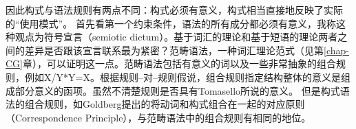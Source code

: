 \noindent 
因此构式与语法规则有两点不同：构式必须有意义，构式相当直接地反映了实际的“使用模式”。
首先看第一个约束条件，语法的所有成分都必须有意义，我称这种观点为符号宣言（semiotic dictum）。基于词汇的理论和基于短语的理论两者之间的差异是否跟该宣言联系最为紧密？范畴语法，一种词汇理论范式（见第\ref{chap-CG}章），可以证明这一点。范畴语法包括有意义的词以及一些非常抽象的组合规则，例如X/Y*Y=X。根据规则--对--规则假说，组合规则指定结构整体的意义是组成部分意义的函项。虽然不清楚规则是否具有Tomasello所说的意义。
但是构式语法的组合规则，如Goldberg提出的将动词和构式组合在一起的对应原则（Correspondence Principle）\citeyearpar[]{Goldberg95a}，与范畴语法中的组合规则有相同的地位。

